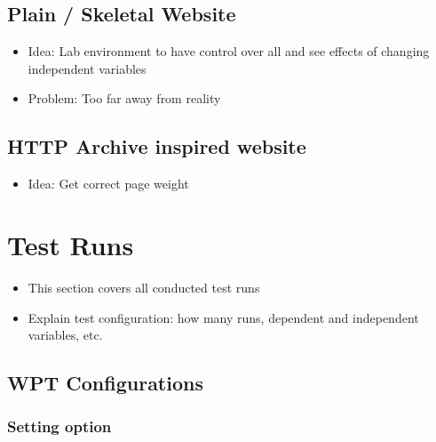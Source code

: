 \subsection{Plain / Skeletal Website}

\begin{itemize}
    \item Idea: Lab environment to have control over all and see effects of changing independent variables
    \item Problem: Too far away from reality
\end{itemize}

\subsection{HTTP Archive inspired website}

\begin{itemize}
    \item Idea: Get correct page weight
\end{itemize}









\section{Test Runs}

\begin{itemize}
    \item This section covers all conducted test runs
    \item Explain test configuration: how many runs, dependent and independent variables, etc.
\end{itemize}

\subsection{WPT Configurations}


\subsubsection{Setting option}

